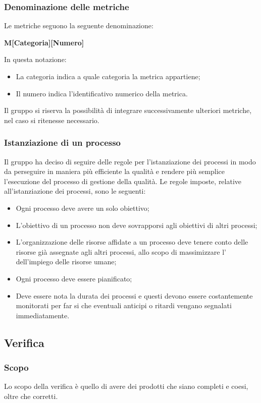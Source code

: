 \subsubsection{Denominazione delle metriche}
Le metriche seguono la seguente denominazione:
\begin{center}
    \textbf{M[Categoria][Numero]}
\end{center}
In questa notazione:
\begin{itemize}
    \item La categoria indica a quale categoria la metrica appartiene;
    \item Il numero indica l'identificativo numerico della metrica.
\end{itemize}
Il gruppo si riserva la possibilità di integrare successivamente ulteriori metriche, nel caso si ritenesse necessario.

\subsubsection{Istanziazione di un processo}
Il gruppo ha deciso di seguire delle regole per l'istanziazione dei processi in modo da perseguire in maniera più 
efficiente la qualità e rendere più semplice l'esecuzione del processo di gestione della qualità. Le regole imposte, 
relative all'istanziazione dei processi, sono le seguenti:
\begin{itemize}
    \item Ogni processo deve avere un solo obiettivo;
    \item L'obiettivo di un processo non deve sovrapporsi agli obiettivi di altri processi;
    \item L'organizzazione delle risorse affidate a un processo deve tenere conto delle risorse già assegnate agli 
    altri processi, allo scopo di massimizzare l' dell'impiego delle risorse umane;
    \item Ogni processo deve essere pianificato;
    \item Deve essere nota la durata dei processi e questi devono essere costantemente monitorati per far si che 
    eventuali anticipi o ritardi vengano segnalati immediatamente.
\end{itemize}

\subsection{Verifica}

\subsubsection{Scopo}
Lo scopo della verifica è quello di avere dei prodotti che siano completi e coesi, oltre che corretti.

